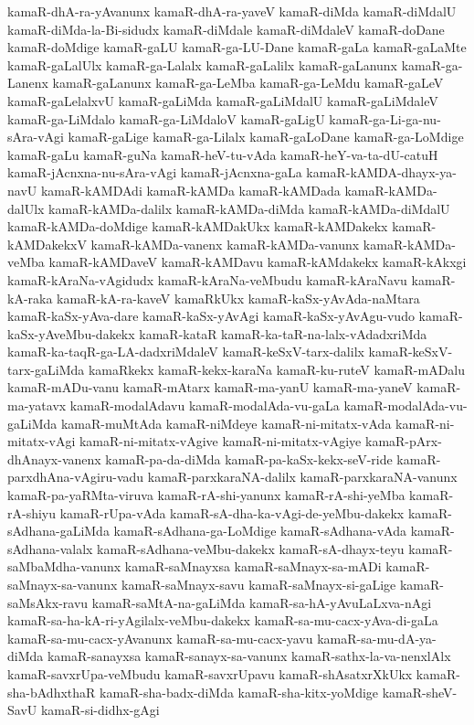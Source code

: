 {kamaR-dhA-ra-yAvanunx
kamaR-dhA-ra-yaveV
kamaR-diMda
kamaR-diMdalU
kamaR-diMda-la-Bi-sidudx
kamaR-diMdale
kamaR-diMdaleV
kamaR-doDane
kamaR-doMdige
kamaR-gaLU
kamaR-ga-LU-Dane
kamaR-gaLa
kamaR-gaLaMte
kamaR-gaLalUlx
kamaR-ga-Lalalx
kamaR-gaLalilx
kamaR-gaLanunx
kamaR-ga-Lanenx
kamaR-gaLanunx
kamaR-ga-LeMba
kamaR-ga-LeMdu
kamaR-gaLeV
kamaR-gaLelalxvU
kamaR-gaLiMda
kamaR-gaLiMdalU
kamaR-gaLiMdaleV
kamaR-ga-LiMdalo
kamaR-ga-LiMdaloV
kamaR-gaLigU
kamaR-ga-Li-ga-nu-sAra-vAgi
kamaR-gaLige
kamaR-ga-Lilalx
kamaR-gaLoDane
kamaR-ga-LoMdige
kamaR-gaLu
kamaR-guNa
kamaR-heV-tu-vAda
kamaR-heY-va-ta-dU-catuH
kamaR-jAcnxna-nu-sAra-vAgi
kamaR-jAcnxna-gaLa
kamaR-kAMDA-dhayx-ya-navU
kamaR-kAMDAdi
kamaR-kAMDa
kamaR-kAMDada
kamaR-kAMDa-dalUlx
kamaR-kAMDa-dalilx
kamaR-kAMDa-diMda
kamaR-kAMDa-diMdalU
kamaR-kAMDa-doMdige
kamaR-kAMDakUkx
kamaR-kAMDakekx
kamaR-kAMDakekxV
kamaR-kAMDa-vanenx
kamaR-kAMDa-vanunx
kamaR-kAMDa-veMba
kamaR-kAMDaveV
kamaR-kAMDavu
kamaR-kAMdakekx
kamaR-kAkxgi
kamaR-kAraNa-vAgidudx
kamaR-kAraNa-veMbudu
kamaR-kAraNavu
kamaR-kA-raka
kamaR-kA-ra-kaveV
kamaRkUkx
kamaR-kaSx-yAvAda-naMtara
kamaR-kaSx-yAva-dare
kamaR-kaSx-yAvAgi
kamaR-kaSx-yAvAgu-vudo
kamaR-kaSx-yAveMbu-dakekx
kamaR-kataR
kamaR-ka-taR-na-lalx-vAdadxriMda
kamaR-ka-taqR-ga-LA-dadxriMdaleV
kamaR-keSxV-tarx-dalilx
kamaR-keSxV-tarx-gaLiMda
kamaRkekx
kamaR-kekx-karaNa
kamaR-ku-ruteV
kamaR-mADalu
kamaR-mADu-vanu
kamaR-mAtarx
kamaR-ma-yanU
kamaR-ma-yaneV
kamaR-ma-yatavx
kamaR-modalAdavu
kamaR-modalAda-vu-gaLa
kamaR-modalAda-vu-gaLiMda
kamaR-muMtAda
kamaR-niMdeye
kamaR-ni-mitatx-vAda
kamaR-ni-mitatx-vAgi
kamaR-ni-mitatx-vAgive
kamaR-ni-mitatx-vAgiye
kamaR-pArx-dhAnayx-vanenx
kamaR-pa-da-diMda
kamaR-pa-kaSx-kekx-seV-ride
kamaR-parxdhAna-vAgiru-vadu
kamaR-parxkaraNA-dalilx
kamaR-parxkaraNA-vanunx
kamaR-pa-yaRMta-viruva
kamaR-rA-shi-yanunx
kamaR-rA-shi-yeMba
kamaR-rA-shiyu
kamaR-rUpa-vAda
kamaR-sA-dha-ka-vAgi-de-yeMbu-dakekx
kamaR-sAdhana-gaLiMda
kamaR-sAdhana-ga-LoMdige
kamaR-sAdhana-vAda
kamaR-sAdhana-valalx
kamaR-sAdhana-veMbu-dakekx
kamaR-sA-dhayx-teyu
kamaR-saMbaMdha-vanunx
kamaR-saMnayxsa
kamaR-saMnayx-sa-mADi
kamaR-saMnayx-sa-vanunx
kamaR-saMnayx-savu
kamaR-saMnayx-si-gaLige
kamaR-saMsAkx-ravu
kamaR-saMtA-na-gaLiMda
kamaR-sa-hA-yAvuLaLxva-nAgi
kamaR-sa-ha-kA-ri-yAgilalx-veMbu-dakekx
kamaR-sa-mu-cacx-yAva-di-gaLa
kamaR-sa-mu-cacx-yAvanunx
kamaR-sa-mu-cacx-yavu
kamaR-sa-mu-dA-ya-diMda
kamaR-sanayxsa
kamaR-sanayx-sa-vanunx
kamaR-sathx-la-va-nenxlAlx
kamaR-savxrUpa-veMbudu
kamaR-savxrUpavu
kamaR-shAsatxrXkUkx
kamaR-sha-bAdhxthaR
kamaR-sha-badx-diMda
kamaR-sha-kitx-yoMdige
kamaR-sheV-SavU
kamaR-si-didhx-gAgi
}
